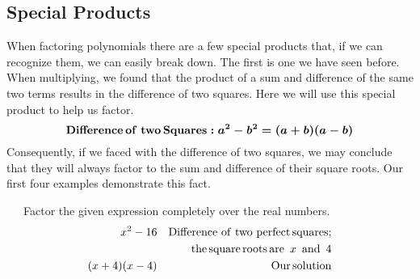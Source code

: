 \subsection{Special Products}

{}\pp

When factoring polynomials there are a few special products that, if we can recognize
them, we can easily break down. The first is one we have seen before.
When multiplying, we found that the product of a sum and difference of the same two terms results in the difference of two squares. Here we will use this special product to help us factor.
\[ \boldsymbol{\operatorname{Difference} \operatorname{of~two} \operatorname{Squares} : a^2 - b^2 = (a + b)
   (a - b)} \]
Consequently, if we faced with the difference of two squares, we may conclude that they will always factor to the
sum and difference of their square roots.  Our first four examples demonstrate this fact.

\begin{example}~~~Factor the given expression completely over the real numbers.
  \begin{eqnarray*}
    x^2 - 16 &  & \operatorname{Difference~of~two~perfect} \operatorname{squares};\\
		& & ~~~\operatorname{the} \operatorname{square} \operatorname{roots} \operatorname{are~} x \operatorname{~and~} 4\\
    (x + 4) (x - 4) &  & \operatorname{Our} \operatorname{solution}
  \end{eqnarray*}
\end{example}


